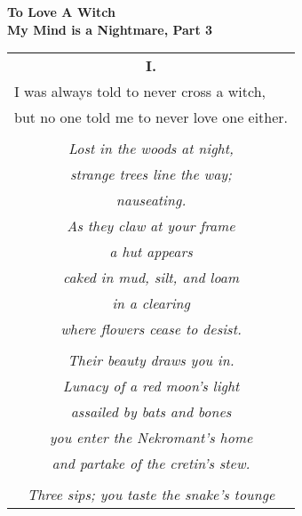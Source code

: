 \documentclass{article}
\begin{document}
\newcommand{\h}{\hspace*{4ex}}


\begin{center}
\textbf{To Love A Witch} \\ %
{\small\textbf{My Mind is a Nightmare, Part 3}} \\
\vspace*{2ex}
\begin{longtable}{l}
\multicolumn{1}{c}{\textbf{I.}} \\
I was always told to never cross a witch, \\
but no one told me to never love one either. \\
\\
\multicolumn{1}{c}{\textit{Lost in the woods at night,}} \\
\multicolumn{1}{c}{\textit{strange trees line the way;}} \\
\multicolumn{1}{c}{\textit{nauseating.}} \\
\multicolumn{1}{c}{\textit{As they claw at your frame}} \\
\multicolumn{1}{c}{\textit{a hut appears}} \\
\multicolumn{1}{c}{\textit{caked in mud, silt, and loam}} \\
\multicolumn{1}{c}{\textit{in a clearing}} \\
\multicolumn{1}{c}{\textit{where flowers cease to desist.}} \\
\\
\multicolumn{1}{c}{\textit{Their beauty draws you in.}} \\
\multicolumn{1}{c}{\textit{Lunacy of a red moon's light}} \\
\multicolumn{1}{c}{\textit{assailed by bats and bones}} \\
\multicolumn{1}{c}{\textit{you enter the Nekromant's home}} \\
\multicolumn{1}{c}{\textit{and partake of the cretin's stew.}} \\
\\
\multicolumn{1}{c}{\textit{Three sips; you taste the snake's tounge}} \\

\end{longtable}
\end{center}
\end{document}
